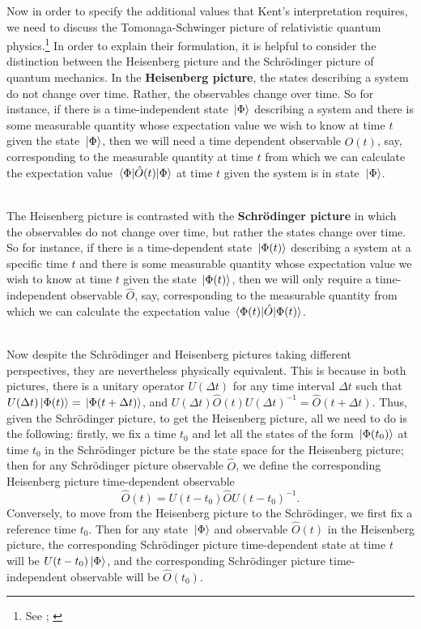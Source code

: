 Now in order to specify the additional values that Kent's interpretation requires, we need to discuss the Tomonaga-Schwinger picture of relativistic quantum physics.\footnote{See \cite{SchwingerJulianI}; \cite{TomonagaI}} In order to explain their formulation, it is helpful to consider the distinction between the Heisenberg picture and the Schr\"{o}dinger picture of quantum mechanics. In the \textbf{Heisenberg picture}, the states describing a system do not change over time. Rather, the observables change over time. So for instance, if there is a time-independent state $\ket*{\Phi}$ describing a system and there is some measurable quantity whose expectation value we wish to know at time $t$ given the state $\ket*{\Phi}$, then we will need a time dependent observable $\hat{O}(t)$, say, corresponding to the measurable quantity at time $t$ from which we can calculate the expectation value $\ev*{\hat{O}(t)}{\Phi}$ at time $t$  given the system is in state $\ket*{\Phi}$.\strut \\[\baselineskip]
The Heisenberg picture is contrasted with the \textbf{Schr\"{o}dinger picture} in which the observables do not change over time, but rather the states change over time. So for instance, if there is a time-dependent state $\ket*{\Phi(t)}$ describing a system at a specific time $t$ and there is some measurable quantity whose expectation value we wish to know at time $t$ given the state $\ket*{\Phi(t)}$, then we will only require a time-independent observable $\hat{O}$, say, corresponding to the measurable quantity from which we can calculate the expectation value $\ev*{\hat{O}}{\Phi(t)}$.\strut \\[\baselineskip] 
Now despite the Schr\"{o}dinger and Heisenberg pictures taking different perspectives, they are nevertheless physically equivalent. This is because in both pictures, there is a unitary operator $U(\Delta t)$ for any time interval $\Delta t$ such that $U(\Delta t)\ket*{\Phi(t)}=\ket*{\Phi(t+\Delta t)}$, and $U(\Delta t)\hat{O}(t)U(\Delta t)^{-1}=\hat{O}(t+\Delta t)$. Thus, given the Schr\"{o}dinger picture, to get the Heisenberg picture, all we need to do is the following: firstly, we fix a time $t_0$ and let all the states of the form $\ket*{\Phi(t_0)}$ at time $t_0$ in the Schr\"{o}dinger picture be the state space for the Heisenberg picture; then for any Schr\"{o}dinger picture observable $\hat{O}$, we define the corresponding Heisenberg picture time-dependent observable 
$$\hat{O}(t)=U(t-t_0)\hat{O}U(t-t_0)^{-1}.$$ 
Conversely, to move from the Heisenberg picture to the Schr\"{o}dinger, we first fix a reference time $t_0$. Then for any state $\ket*{\Phi}$ and observable $\hat{O}(t)$ in the Heisenberg picture, the corresponding Schr\"{o}dinger picture time-dependent state at time $t$ will be $U(t-t_0)\ket*{\Phi}$, and the corresponding Schr\"{o}dinger picture time-independent observable will be $\hat{O}(t_0)$.

